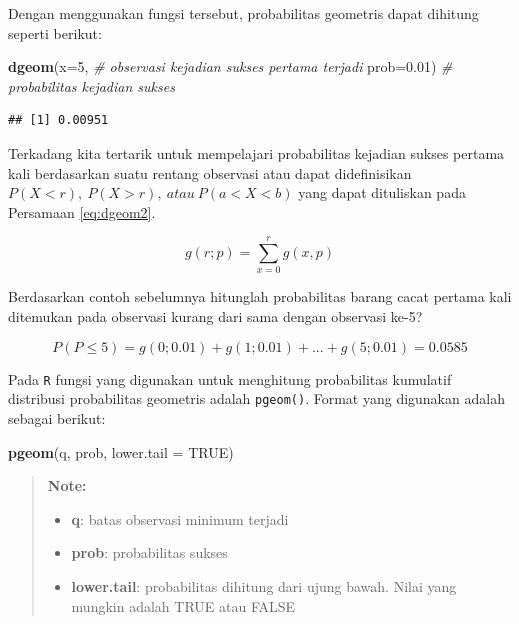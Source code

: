 \documentclass[]{book}
\newenvironment{Shaded}{\begin{snugshade}}{\end{snugshade}}
\newcommand{\KeywordTok}[1]{\textcolor[rgb]{0.13,0.29,0.53}{\textbf{#1}}}
\newcommand{\DataTypeTok}[1]{\textcolor[rgb]{0.13,0.29,0.53}{#1}}
\newcommand{\DecValTok}[1]{\textcolor[rgb]{0.00,0.00,0.81}{#1}}
\newcommand{\FloatTok}[1]{\textcolor[rgb]{0.00,0.00,0.81}{#1}}
\newcommand{\CommentTok}[1]{\textcolor[rgb]{0.56,0.35,0.01}{\textit{#1}}}
\newcommand{\OtherTok}[1]{\textcolor[rgb]{0.56,0.35,0.01}{#1}}
\newcommand{\NormalTok}[1]{#1}
\providecommand{\tightlist}{%
  \setlength{\itemsep}{0pt}\setlength{\parskip}{0pt}}
\begin{document}
Dengan menggunakan fungsi tersebut, probabilitas geometris dapat
dihitung seperti berikut:

\begin{Shaded}
\begin{Highlighting}[]
\KeywordTok{dgeom}\NormalTok{(}\DataTypeTok{x=}\DecValTok{5}\NormalTok{, }\CommentTok{# observasi kejadian sukses pertama terjadi}
      \DataTypeTok{prob=}\FloatTok{0.01}\NormalTok{) }\CommentTok{# probabilitas kejadian sukses}
\end{Highlighting}
\end{Shaded}

\begin{verbatim}
## [1] 0.00951
\end{verbatim}

Terkadang kita tertarik untuk mempelajari probabilitas kejadian sukses
pertama kali berdasarkan suatu rentang observasi atau dapat
didefinisikan
\(P\left(X<r\right),\ P\left(X>r\right),\ atau\ P\left(a<X<b\right)\)
yang dapat dituliskan pada Persamaan \eqref{eq:dgeom2}.

\begin{equation}
   g\left(r;p\right)=\sum _{x=0}^rg\left(x,p\right)
  \label{eq:dgeom2}
\end{equation}

Berdasarkan contoh sebelumnya hitunglah probabilitas barang cacat
pertama kali ditemukan pada observasi kurang dari sama dengan observasi
ke-5?

\[
P\left(P\le5\right)=g\left(0;0.01\right)+g\left(1;0.01\right)+...+g\left(5;0.01\right)=0.0585
\]

Pada \texttt{R} fungsi yang digunakan untuk menghitung probabilitas
kumulatif distribusi probabilitas geometris adalah \texttt{pgeom()}.
Format yang digunakan adalah sebagai berikut:

\begin{Shaded}
\begin{Highlighting}[]
\KeywordTok{pgeom}\NormalTok{(q, prob, }\DataTypeTok{lower.tail =} \OtherTok{TRUE}\NormalTok{)}
\end{Highlighting}
\end{Shaded}

\begin{quote}
\textbf{Note: }

\begin{itemize}
\tightlist
\item
  \textbf{q}: batas observasi minimum terjadi
\item
  \textbf{prob}: probabilitas sukses
\item
  \textbf{lower.tail}: probabilitas dihitung dari ujung bawah. Nilai
  yang mungkin adalah TRUE atau FALSE
\end{itemize}
\end{quote}
\end{document}
